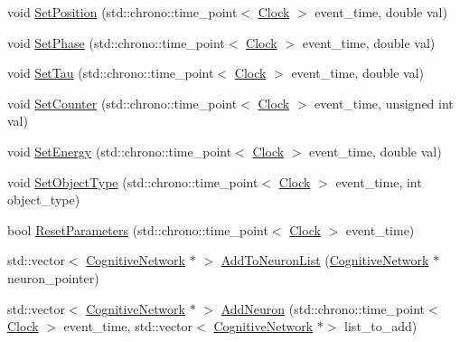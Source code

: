 \begin{DoxyCompactItemize}
\item 
void \mbox{\hyperlink{classOrbital_a16ff46f7e720f2f7aed332585310a9b8}{Set\+Position}} (std\+::chrono\+::time\+\_\+point$<$ \mbox{\hyperlink{universe_8h_a0ef8d951d1ca5ab3cfaf7ab4c7a6fd80}{Clock}} $>$ event\+\_\+time, double val)
\item 
void \mbox{\hyperlink{classOrbital_ac1c58fcb56e4d5c19c4ab39cc09c88ad}{Set\+Phase}} (std\+::chrono\+::time\+\_\+point$<$ \mbox{\hyperlink{universe_8h_a0ef8d951d1ca5ab3cfaf7ab4c7a6fd80}{Clock}} $>$ event\+\_\+time, double val)
\item 
void \mbox{\hyperlink{classOrbital_afd09baa67f1a9bff08c74dcf60e1398a}{Set\+Tau}} (std\+::chrono\+::time\+\_\+point$<$ \mbox{\hyperlink{universe_8h_a0ef8d951d1ca5ab3cfaf7ab4c7a6fd80}{Clock}} $>$ event\+\_\+time, double val)
\item 
void \mbox{\hyperlink{classOrbital_ae2a2fb06700d1d68501b0cbdea87cc08}{Set\+Counter}} (std\+::chrono\+::time\+\_\+point$<$ \mbox{\hyperlink{universe_8h_a0ef8d951d1ca5ab3cfaf7ab4c7a6fd80}{Clock}} $>$ event\+\_\+time, unsigned int val)
\item 
void \mbox{\hyperlink{classOrbital_a20b0f4d549fd9024df89603a5adcc214}{Set\+Energy}} (std\+::chrono\+::time\+\_\+point$<$ \mbox{\hyperlink{universe_8h_a0ef8d951d1ca5ab3cfaf7ab4c7a6fd80}{Clock}} $>$ event\+\_\+time, double val)
\item 
void \mbox{\hyperlink{classOrbital_afd0dfd382d4bf7d9fbace315bd37fa85}{Set\+Object\+Type}} (std\+::chrono\+::time\+\_\+point$<$ \mbox{\hyperlink{universe_8h_a0ef8d951d1ca5ab3cfaf7ab4c7a6fd80}{Clock}} $>$ event\+\_\+time, int object\+\_\+type)
\item 
bool \mbox{\hyperlink{classOrbital_acc6137a5a79be91a255f685a2f065330}{Reset\+Parameters}} (std\+::chrono\+::time\+\_\+point$<$ \mbox{\hyperlink{universe_8h_a0ef8d951d1ca5ab3cfaf7ab4c7a6fd80}{Clock}} $>$ event\+\_\+time)
\item 
std\+::vector$<$ \mbox{\hyperlink{classCognitiveNetwork}{Cognitive\+Network}} $\ast$ $>$ \mbox{\hyperlink{classOrbital_a44230cebc40357d186c442bfac2507a4}{Add\+To\+Neuron\+List}} (\mbox{\hyperlink{classCognitiveNetwork}{Cognitive\+Network}} $\ast$neuron\+\_\+pointer)
\item 
std\+::vector$<$ \mbox{\hyperlink{classCognitiveNetwork}{Cognitive\+Network}} $\ast$ $>$ \mbox{\hyperlink{classOrbital_a57480cdd63dd1bf731864f513767800d}{Add\+Neuron}} (std\+::chrono\+::time\+\_\+point$<$ \mbox{\hyperlink{universe_8h_a0ef8d951d1ca5ab3cfaf7ab4c7a6fd80}{Clock}} $>$ event\+\_\+time, std\+::vector$<$ \mbox{\hyperlink{classCognitiveNetwork}{Cognitive\+Network}} $\ast$$>$ list\+\_\+to\+\_\+add)
$$
\end{DoxyCompactItemize}
